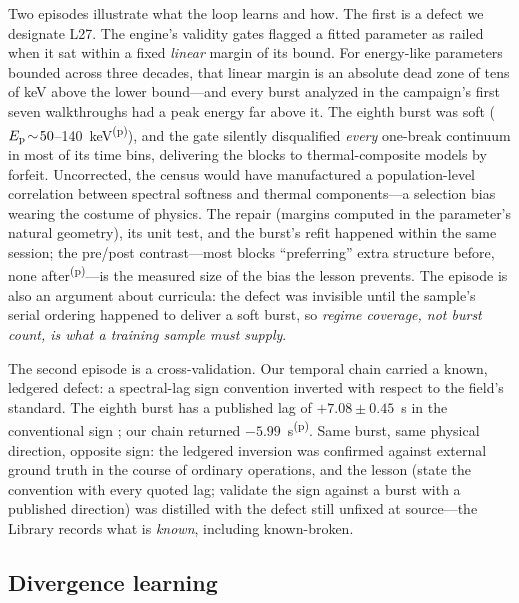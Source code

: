 \documentclass[twocolumn]{aastex631}
\newcommand{\prov}{\textsuperscript{(p)}}   %
\newcommand{\Ep}{E_{\rm p}}
\begin{document}
Two episodes illustrate what the loop learns and how. The first is a defect
we designate L27. The engine's validity gates flagged a fitted parameter as
railed when it sat within a fixed \emph{linear} margin of its bound. For
energy-like parameters bounded across three decades, that linear margin is
an absolute dead zone of tens of keV above the lower bound---and every burst
analyzed in the campaign's first seven walkthroughs had a peak energy far
above it. The eighth burst was soft ($\Ep\!\sim\!50$--140~keV\prov), and the
gate silently disqualified \emph{every} one-break continuum in most of its
time bins, delivering the blocks to thermal-composite models by forfeit.
Uncorrected, the census would have manufactured a population-level
correlation between spectral softness and thermal components---a selection
bias wearing the costume of physics. The repair (margins computed in the
parameter's natural geometry), its unit test, and the burst's refit happened
within the same session; the pre/post contrast---most blocks ``preferring''
extra structure before, none after\prov---is the measured size of the bias
the lesson prevents. The episode is also an argument about curricula:
the defect was invisible until the sample's serial ordering happened to
deliver a soft burst, so \emph{regime coverage, not burst count, is what a
training sample must supply}.

The second episode is a cross-validation. Our temporal chain carried a
known, ledgered defect: a spectral-lag sign convention inverted with respect
to the field's standard. The eighth burst has a published lag of
$+7.08\pm0.45$~s in the conventional sign \citep{2018ApJ...865..153L}; our
chain returned $-5.99$~s\prov. Same burst, same physical direction, opposite
sign: the ledgered inversion was confirmed against external ground truth in
the course of ordinary operations, and the lesson (state the convention with
every quoted lag; validate the sign against a burst with a published
direction) was distilled with the defect still unfixed at source---the
Library records what is \emph{known}, including known-broken.

\subsection{Divergence learning} \label{sec:divergence}
\end{document}
